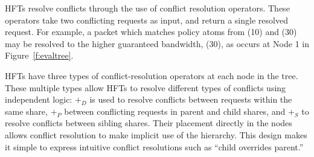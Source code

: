 %
%
%



HFTs resolve conflicts through the use of conflict resolution operators.
These operators take two conflicting requests as input, and return a single
resolved request. For example, a packet which matches policy atoms from (10)
and (30) may be resolved to the higher guaranteed bandwidth,
(30), as occurs at Node 1 in Figure~\ref{f:evaltree}.

HFTs have three types of conflict-resolution operators at each node in the tree. 
These multiple types allow HFTs to resolve different types of conflicts using
independent logic: $+_D$ is used to resolve conflicts between requests
within the same share, $+_P$ between conflicting requests in parent and
child shares, and $+_S$ to resolve conflicts between sibling shares.
Their placement directly in the nodes allows conflict resolution to make implicit use of
the hierarchy.
This design makes it simple to express intuitive conflict resolutions such as
``child overrides parent.''

